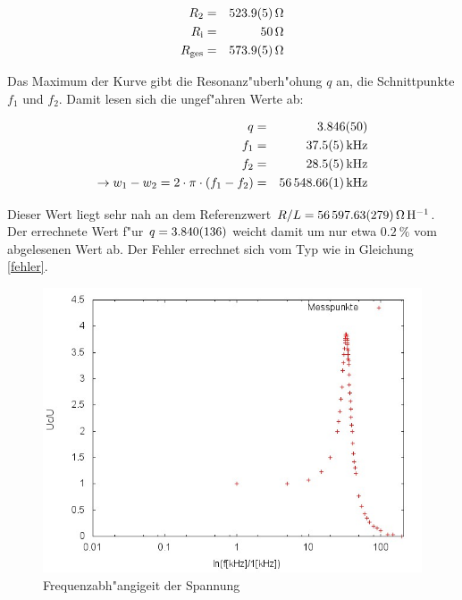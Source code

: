 	\begin{eqnarray*}
		R_\mathrm{2} &=& \SI{523.9 (5)}{\ohm}\\
		R_\mathrm{i} &=& \SI{50}{\ohm}\\
		R_\mathrm{ges} &=& \SI{573.9 (5)}{\ohm}
	\end{eqnarray*}

	Das Maximum der Kurve gibt die Resonanz"uberh"ohung $q$ an, die Schnittpunkte $f_1$ und $f_2$.
	Damit lesen sich die ungef"ahren Werte ab:

	\begin{eqnarray*}
		q &=& \SI{3.846 (50)}{}\\
		f_1 &=& \SI{37.5 (5)}{\kilo\hertz}\\
		f_2 &=& \SI{28.5 (5)}{\kilo\hertz}\\
		\rightarrow w_1 - w_2 = 2 \cdot \pi \cdot (f_1 - f_2) &=& \SI{56548.66 (1)}{\kilo\hertz}\\
	\end{eqnarray*}

	Dieser Wert liegt sehr nah an dem Referenzwert $R/L = \SI{56597.63 (279)}{\ohm \per \henry}$.
	Der errechnete Wert f"ur $q = \SI{3.840 (136)}{}$ weicht damit um nur etwa $\SI{0.2}{\%}$ vom abgelesenen Wert ab.
	Der Fehler errechnet sich vom Typ wie in Gleichung \eqref{fehler}.

	

	\begin{figure}[htbp]
		\centering
		\includegraphics[width = 12cm]{img/graph_c.jpg}
		\caption{Frequenzabh"angigeit der Spannung}
		\label{frequenz_1}
	\end{figure}

